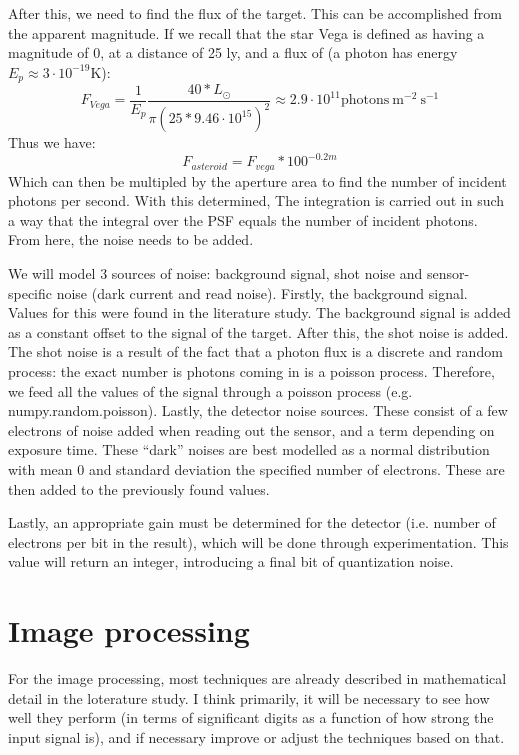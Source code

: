 \documentclass[a4paper,10pt]{article}
\begin{document}
After this, we need to find the flux of the target. This can be accomplished from the apparent magnitude. If we recall that the star Vega is defined as having a magnitude of 0, at a distance of 25 ly, and a flux of (a photon has energy $E_p \approx 3\cdot 10^{-19}$K):
\begin{equation}
 F_{Vega} = \frac{1}{E_p}\frac{40 * L_\odot}{\pi \left(25 * 9.46 \cdot 10^{15}\right)^2} \approx 2.9 \cdot 10^{11} \mathrm{photons}~\mathrm{m}^{-2}~\mathrm{s}^{-1}
\end{equation}
Thus we have:
\begin{equation}
 F_{asteroid} = F_{vega} * 100^{-0.2m}
\end{equation}
Which can then be multipled by the aperture area to find the number of incident photons per second. With this determined, The integration is carried out in such a way that the integral over the PSF equals the number of incident photons. From here, the noise needs to be added.

We will model 3 sources of noise: background signal, shot noise and sensor-specific noise (dark current and read noise). Firstly, the background signal. Values for this were found in the literature study. The background signal is added as a constant offset to the signal of the target. After this, the shot noise is added. The shot noise is a result of the fact that a photon flux is a discrete and random process: the exact number is photons coming in is a poisson process. Therefore, we feed all the values of the signal through a poisson process (e.g. numpy.random.poisson). Lastly, the detector noise sources. These consist of a few electrons of noise added when reading out the sensor, and a term depending on exposure time. These ``dark'' noises are best modelled as a normal distribution with mean 0 and standard deviation the specified number of electrons. These are then added to the previously found values.

Lastly, an appropriate gain must be determined for the detector (i.e. number of electrons per bit in the result), which will be done through experimentation. This value will return an integer, introducing a final bit of quantization noise.

\section{Image processing}

For the image processing, most techniques are already described in mathematical detail in the loterature study. I think primarily, it will be necessary to see how well they perform (in terms of significant digits as a function of how strong the input signal is), and if necessary improve or adjust the techniques based on that.
\end{document}
